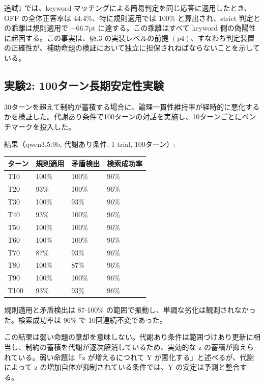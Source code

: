 \documentclass[12pt,a4paper]{article}
\begin{document}
追試1 では、keyword マッチングによる簡易判定を同じ応答に適用したとき、OFF の全体正答率は 44.4\%、特に規則適用では 100\% と算出され、strict 判定との乖離は規則適用で −66.7pt に達する。この乖離はすべて keyword 側の偽陽性に起因する。この事実は、§8.3 の実装レベルの前提 \((p4)\)、すなわち判定装置の正確性が、補助命題の検証において独立に担保されねばならないことを示している。

\subsection{実験2: 100ターン長期安定性実験}\label{ux5b9fux9a132-100ux30bfux30fcux30f3ux9577ux671fux5b89ux5b9aux6027ux5b9fux9a13}

30ターンを超えて制約が蓄積する場合に、論理一貫性維持率が経時的に悪化するかを検証した。代謝あり条件で100ターンの対話を実施し、10ターンごとにベンチマークを投入した。

結果（qwen3.5:9b, 代謝あり条件, 1 trial, 100ターン）:

{\def\LTcaptype{table} %
\begin{longtable}[]{@{}llll@{}}
\toprule\noalign{}
ターン & 規則適用 & 矛盾検出 & 検索成功率 \\
\midrule\noalign{}
\endhead
\bottomrule\noalign{}
\endlastfoot
T10 & 100\% & 100\% & 96\% \\
T20 & 93\% & 100\% & 96\% \\
T30 & 100\% & 93\% & 96\% \\
T40 & 93\% & 100\% & 96\% \\
T50 & 100\% & 100\% & 96\% \\
T60 & 100\% & 100\% & 96\% \\
T70 & 87\% & 93\% & 96\% \\
T80 & 100\% & 87\% & 96\% \\
T90 & 100\% & 100\% & 96\% \\
T100 & 93\% & 93\% & 96\% \\
\end{longtable}
}

規則適用と矛盾検出は 87-100\% の範囲で振動し、単調な劣化は観測されなかった。検索成功率は 96\% で 10回連続不変であった。

この結果は弱い命題の棄却を意味しない。代謝あり条件は範囲づけあり更新に相当し、制約の蓄積を代謝が逐次解消しているため、実効的な z の蓄積が抑えられている。弱い命題は「z が増えるにつれて Y が悪化する」と述べるが、代謝によって z の増加自体が抑制されている条件では、Y の安定は予測と整合する。
\end{document}
